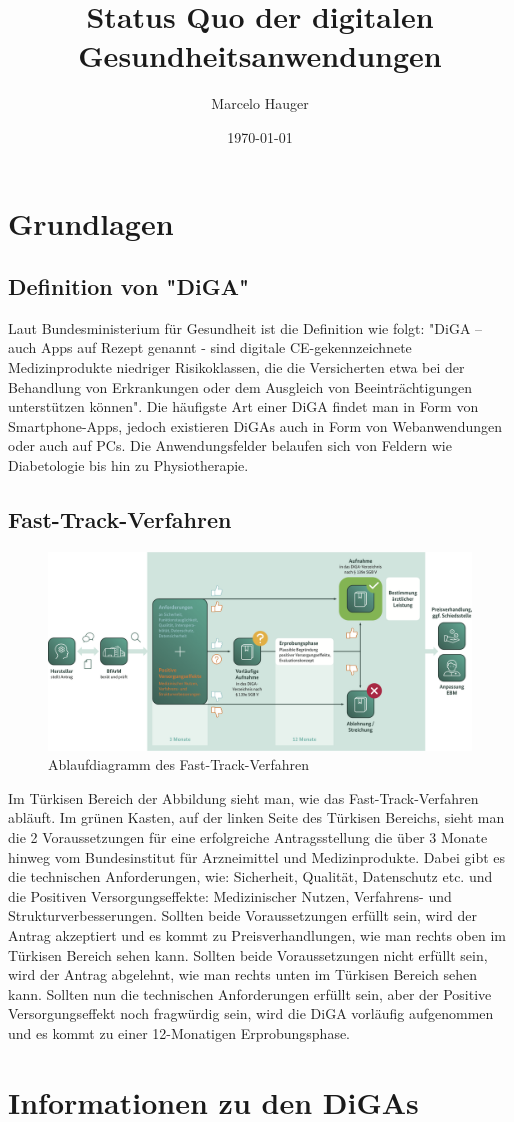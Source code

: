 \documentclass{article}
\title{Status Quo der digitalen Gesundheitsanwendungen}
\author{Marcelo Hauger}
\date{\today}
\begin{document}
	\maketitle
	\newpage
	\tableofcontents
	\newpage
	\section{Grundlagen}
		\subsection{Definition von "DiGA"}
			Laut Bundesministerium für Gesundheit ist die Definition wie folgt: "DiGA – auch Apps auf Rezept genannt - sind digitale CE-gekennzeichnete Medizinprodukte niedriger Risikoklassen, die die Versicherten etwa bei der Behandlung von Erkrankungen oder dem Ausgleich von Beeinträchtigungen unterstützen können"\cite{BfArM-DiGA}. Die häufigste Art einer DiGA findet man in Form von Smartphone-Apps, jedoch existieren DiGAs auch in Form von Webanwendungen oder auch auf PCs. Die Anwendungsfelder belaufen sich von Feldern wie Diabetologie bis hin zu Physiotherapie.\cite[vgl. p. 1]{BfArM-DiGA} 
		\subsection{Fast-Track-Verfahren} 
			\begin{figure}[h]
				\includegraphics[width=\textwidth]{./grafiken/fast-track-verfahren}
				\caption[Ablaufdiagramm des Fast-Track-Verfahren]{Ablaufdiagramm des Fast-Track-Verfahren}
			\end{figure}
			Im Türkisen Bereich der Abbildung sieht man, wie das Fast-Track-Verfahren abläuft. Im grünen Kasten, auf der linken Seite des Türkisen Bereichs, sieht man die 2 Voraussetzungen für eine erfolgreiche Antragsstellung die über 3 Monate hinweg vom Bundesinstitut für Arzneimittel und Medizinprodukte. Dabei gibt es die technischen Anforderungen, wie: Sicherheit, Qualität, Datenschutz etc. und die Positiven Versorgungseffekte: Medizinischer Nutzen, Verfahrens- und Strukturverbesserungen. Sollten beide Voraussetzungen erfüllt sein, wird der Antrag akzeptiert und es kommt zu Preisverhandlungen, wie man rechts oben im Türkisen Bereich sehen kann. Sollten beide Voraussetzungen nicht erfüllt sein, wird der Antrag abgelehnt, wie man rechts unten im Türkisen Bereich sehen kann. Sollten nun die technischen Anforderungen erfüllt sein, aber der Positive Versorgungseffekt noch fragwürdig sein, wird die DiGA vorläufig aufgenommen und es kommt zu einer 12-Monatigen Erprobungsphase.
	\section{Informationen zu den DiGAs}        



\end{document}
